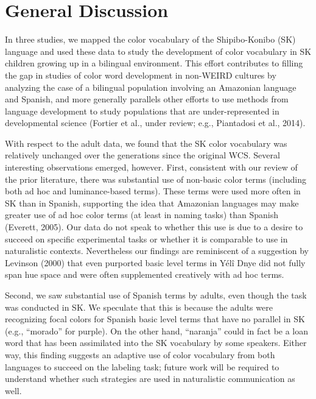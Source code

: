 \documentclass[
  ,apa7,floatsintext]{apa6}
\begin{document}
\hypertarget{general-discussion}{%
\section{General Discussion}\label{general-discussion}}

In three studies, we mapped the color vocabulary of the Shipibo-Konibo (SK) language and used these data to study the development of color vocabulary in SK children growing up in a bilingual environment. This effort contributes to filling the gap in studies of color word development in non-WEIRD cultures by analyzing the case of a bilingual population involving an Amazonian language and Spanish, and more generally parallels other efforts to use methods from language development to study populations that are under-represented in developmental science (Fortier et al., under review; e.g., Piantadosi et al., 2014).

With respect to the adult data, we found that the SK color vocabulary was relatively unchanged over the generations since the original WCS. Several interesting observations emerged, however. First, consistent with our review of the prior literature, there was substantial use of non-basic color terms (including both ad hoc and luminance-based terms). These terms were used more often in SK than in Spanish, supporting the idea that Amazonian languages may make greater use of ad hoc color terms (at least in naming tasks) than Spanish (Everett, 2005). Our data do not speak to whether this use is due to a desire to succeed on specific experimental tasks or whether it is comparable to use in naturalistic contexts. Nevertheless our findings are reminiscent of a suggestion by Levinson (2000) that even purported basic level terms in Yélî Dnye did not fully span hue space and were often supplemented creatively with ad hoc terms.

Second, we saw substantial use of Spanish terms by adults, even though the task was conducted in SK. We speculate that this is because the adults were recognizing focal colors for Spanish basic level terms that have no parallel in SK (e.g., ``morado'' for purple). On the other hand, ``naranja'' could in fact be a loan word that has been assimilated into the SK vocabulary by some speakers. Either way, this finding suggests an adaptive use of color vocabulary from both languages to succeed on the labeling task; future work will be required to understand whether such strategies are used in naturalistic communication as well.
\end{document}
